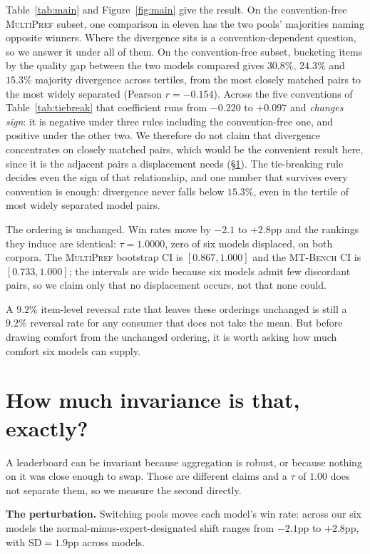 \documentclass{article}
\begin{document}
Table~\ref{tab:main} and Figure~\ref{fig:main} give the result. On
the convention-free \textsc{MultiPref} subset, one comparison in eleven has the two pools' majorities naming
opposite winners. Where the divergence sits is a convention-dependent question, so we answer it
under all of them. On the convention-free subset, bucketing items by the quality
gap between the two models compared gives $30.8\%$, $24.3\%$ and $15.3\%$ majority
divergence across tertiles, from the most closely matched pairs to the most widely
separated (Pearson $r = -0.154$). Across the five conventions of Table~\ref{tab:tiebreak} that
coefficient runs from $-0.220$ to $+0.097$ and \emph{changes sign}: it is negative under
three rules including the convention-free one, and positive under the other two. We
therefore do not claim that divergence concentrates on closely matched pairs, which would
be the convenient result here, since it is the adjacent pairs a displacement needs
(\S\ref{sec:threshold}). The tie-breaking rule decides even the sign of that relationship,
and one number that survives every convention is enough: divergence never falls below
$15.3\%$, even in the tertile of most widely separated model pairs.

The ordering is unchanged. Win rates move by $-2.1$ to $+2.8$pp and the rankings they
induce are identical: $\tau = 1.0000$, zero of six models displaced, on both corpora. The \textsc{MultiPref} bootstrap CI is
$[0.867, 1.000]$ and the \textsc{MT-Bench} CI is $[0.733, 1.000]$; the intervals
are wide because six models admit few discordant pairs, so we claim only that no
displacement occurs, not that none could.

A $9.2\%$ item-level reversal rate that leaves these orderings unchanged is still a $9.2\%$
reversal rate for any consumer that does not take the mean. But before drawing comfort from
the unchanged ordering, it is worth asking how much comfort six models can supply.

\section{How much invariance is that, exactly?}\label{sec:threshold}

A leaderboard can be invariant because aggregation is robust, or because nothing on it was
close enough to swap. Those are different claims and a $\tau$ of $1.00$ does not separate
them, so we measure the second directly.

\textbf{The perturbation.} Switching pools moves each model's win rate: across our six models
the normal-minus-expert-designated shift ranges from $-2.1$pp to $+2.8$pp, with
$\mathrm{SD} = 1.9$pp across models.
\end{document}
